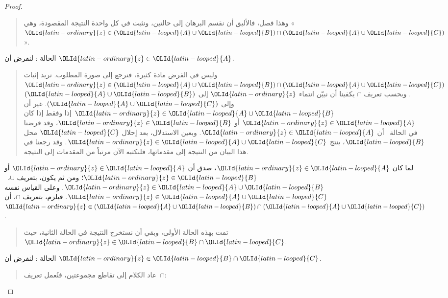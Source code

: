 \documentclass[../../../include/open-logic-section]{subfiles}
\begin{document}
\begin{proof}
\begin{quote}
وهذا فصل، فالأليق أن نقسم البرهان إلى حالتين، ونثبت في كل واحدة
النتيجة المقصودة، وهي «$\OLId{latin-ordinary}{z} \in (\OLId{latin-looped}{A} \cup \OLId{latin-looped}{B}) \cap (\OLId{latin-looped}{A} \cup \OLId{latin-looped}{C})$».
\end{quote}
الحالة : لنفرض أن $\OLId{latin-ordinary}{z} \in \OLId{latin-looped}{A}$.
\begin{quote}
وليس في الفرض مادة كثيرة، فنرجع إلى صورة المطلوب. نريد إثبات
$\OLId{latin-ordinary}{z} \in (\OLId{latin-looped}{A} \cup \OLId{latin-looped}{B}) \cap (\OLId{latin-looped}{A} \cup \OLId{latin-looped}{C})$. وبحسب تعريف $\cap$ يكفينا أن
نبيّن انتماء $\OLId{latin-ordinary}{z}$ إلى $(\OLId{latin-looped}{A} \cup \OLId{latin-looped}{B})$ وإلى $(\OLId{latin-looped}{A} \cup \OLId{latin-looped}{C})$. غير أن
$\OLId{latin-ordinary}{z} \in \OLId{latin-looped}{A} \cup \OLId{latin-looped}{B}$ إذا وفقط إذا كان $\OLId{latin-ordinary}{z} \in \OLId{latin-looped}{A}$ أو $\OLId{latin-ordinary}{z} \in \OLId{latin-looped}{B}$، وقد فرضنا
في الحالة~ أن $\OLId{latin-ordinary}{z} \in \OLId{latin-looped}{A}$. وبعين الاستدلال، بعد إحلال $\OLId{latin-looped}{C}$ محل $\OLId{latin-looped}{B}$،
ينتج $\OLId{latin-ordinary}{z} \in \OLId{latin-looped}{A} \cup \OLId{latin-looped}{C}$. وقد رجعنا في هذا البيان من النتيجة إلى
مقدماتها، فلنكتبه الآن مرتباً من المقدمات إلى النتيجة.
\end{quote}
لما كان $\OLId{latin-ordinary}{z} \in \OLId{latin-looped}{A}$، صدق أن $\OLId{latin-ordinary}{z} \in \OLId{latin-looped}{A}$ أو $\OLId{latin-ordinary}{z} \in \OLId{latin-looped}{B}$؛ ومن ثم يكون،
بتعريف $\cup$،~$\OLId{latin-ordinary}{z} \in \OLId{latin-looped}{A} \cup \OLId{latin-looped}{B}$. وعلى القياس نفسه
$\OLId{latin-ordinary}{z} \in \OLId{latin-looped}{A} \cup \OLId{latin-looped}{C}$. فيلزم، بتعريف $\cap$، أن
$\OLId{latin-ordinary}{z} \in (\OLId{latin-looped}{A} \cup \OLId{latin-looped}{B}) \cap (\OLId{latin-looped}{A} \cup \OLId{latin-looped}{C})$.
\begin{quote}
تمت بهذه الحالة الأولى، وبقي أن نستخرج النتيجة في الحالة الثانية،
حيث $\OLId{latin-ordinary}{z} \in \OLId{latin-looped}{B} \cap \OLId{latin-looped}{C}$.
\end{quote}
الحالة : لنفرض أن $\OLId{latin-ordinary}{z} \in \OLId{latin-looped}{B} \cap \OLId{latin-looped}{C}$.
\begin{quote}
عاد الكلام إلى تقاطع مجموعتين، فنُعمل تعريف~$\cap$:
\end{quote}

\end{proof}
\end{document}
